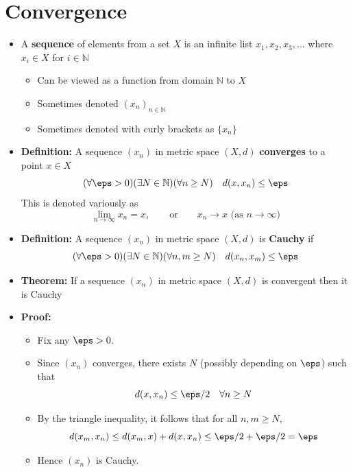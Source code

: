 \documentclass[11pt,twoside]{report}
\newcommand{\bbN}{{\mathbb{N}}}
\begin{document}
\section{Convergence} 
\begin{itemize}
\item  A \textbf{sequence} of elements from a set $X$  is an infinite list $x_1, x_2, x_3, \dots$ where $x_i \in X$ for $i \in \bbN$ 
\begin{itemize}

\item Can be viewed as a function from domain $\bbN$ to  $X$ 

\item Sometimes denoted $(x_n )_{ n \in \bbN}$%

\item Sometimes denoted with curly brackets as $\{x_n\}$
\end{itemize}


\item \textbf{Definition:}  A sequence $(x_n)$  in metric space  $(X,d)$  \textbf{converges} to a point $x \in X$%
\[
( \forall \eps > 0) (\exists N \in \bbN) (\forall n \ge N) \quad   d(x,x_n) \le \eps
\]
This is denoted variously as 
\[
\lim_{n\to \infty} x_n = x , \qquad \text{or} \qquad x_n \to x  \text{  (as $n \to \infty$)}%
\]

\item \textbf{Definition:} 
A sequence $(x_n)$ in metric space  $(X,d)$ is \textbf{Cauchy} if
\[
( \forall \eps > 0) (\exists N \in \bbN) (\forall n,m \ge N) \quad   d(x_n,x_m) \le \eps
\]


\item \textbf{Theorem:} If a sequence  $(x_n)$ in metric space $(X, d)$  is convergent then it is Cauchy 

\item \textbf{Proof:} 
\begin{itemize}
\item Fix any $\eps > 0$. 
\item Since $(x_n)$ converges, there exists $N$ (possibly depending on $\eps$) such that 
\[
d(x,x_n) \le \eps/2 \quad \forall n  \ge N
\]
\item By the triangle inequality, it follows that for all $n,m \ge N$, 
\[
d(x_m, x_n ) \le d(x_m, x) + d(x, x_n) \le  \eps/2 + \eps/2  = \eps 
\]
\item Hence $(x_n)$ is Cauchy. 
\end{itemize}



\end{itemize}
\end{document}
